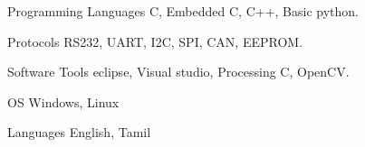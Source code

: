 

\begin{cvskills}

  \cvskill
    {Programming Languages} %
    {C, Embedded C, C++, Basic python.} %

  \cvskill
    {Protocols} %
    {RS232, UART, I2C, SPI, CAN, EEPROM.} %

  \cvskill
    {Software Tools} %
    {eclipse, Visual studio, Processing C, OpenCV.} %

  \cvskill
    {OS} %
    {Windows, Linux} %

  \cvskill
    {Languages} %
    {English, Tamil} %

\end{cvskills}
